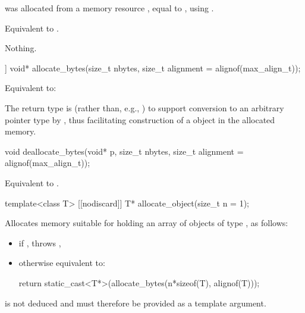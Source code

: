 \begin{itemdescr}
\pnum
\requires
{} was allocated from a memory resource ,
equal to ,
using .

\pnum
\effects
Equivalent to .

\pnum
\throws
Nothing.
\end{itemdescr}

%
\begin{itemdecl}
[[nodiscard]] void* allocate_bytes(size_t nbytes, size_t alignment = alignof(max_align_t));
\end{itemdecl}

\begin{itemdescr}
\pnum
\effects
Equivalent to: 

\pnum
\begin{note}
The return type is  (rather than, e.g., )
to support conversion to an arbitrary pointer type 
by , thus facilitating construction of a 
object in the allocated memory.
\end{note}
\end{itemdescr}

%
\begin{itemdecl}
void deallocate_bytes(void* p, size_t nbytes, size_t alignment = alignof(max_align_t));
\end{itemdecl}

\begin{itemdescr}
\pnum
\effects
Equivalent to .
\end{itemdescr}

%
\begin{itemdecl}
template<class T>
  [[nodiscard]] T* allocate_object(size_t n = 1);
\end{itemdecl}

\begin{itemdescr}
\pnum
\effects
Allocates memory suitable for holding
an array of  objects of type , as follows:
\begin{itemize}
\item
  if ,
  throws ,
\item
  otherwise equivalent to:
\begin{codeblock}
return static_cast<T*>(allocate_bytes(n*sizeof(T), alignof(T)));
\end{codeblock}
\end{itemize}

\pnum
\begin{note}
 is not deduced and must therefore be provided as a template argument.
\end{note}
\end{itemdescr}


